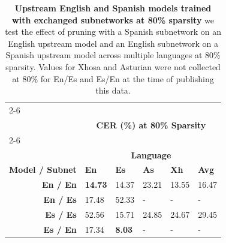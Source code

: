 
\clearpage
\begin{table}
\centering
\begin{tabular}{llllll}
& \\ \cline{2-6} \\[-2.3ex] 
& \multicolumn{5}{c}{\textbf{CER (\%) at 80\% Sparsity}}  \\[0.75ex] \cline{2-6} \\[-2.35ex]
& \multicolumn{5}{c}{\textbf{Language}}  \\[0.5ex] \hline
\multicolumn{1}{l|}{\textbf{Model / Subnet}} & \multicolumn{1}{l}{\textbf{En}} & \multicolumn{1}{l}{\textbf{Es}} & \multicolumn{1}{l}{\textbf{As}} & \multicolumn{1}{l}{\textbf{Xh}} & \multicolumn{1}{l}{\textbf{Avg}} \\ \hline
\multicolumn{1}{r|}{\textbf{En / En}} & \multicolumn{1}{l}{\textbf{14.73}} & \multicolumn{1}{l}{14.37} & \multicolumn{1}{l}{23.21} & \multicolumn{1}{l}{13.55} & 16.47 \\ %
\multicolumn{1}{r|}{\textbf{En / Es}} & \multicolumn{1}{l}{17.48} & \multicolumn{1}{l}{52.33} & \multicolumn{1}{l}{-} & \multicolumn{1}{l}{-} & - \\ %
\multicolumn{1}{r|}{\textbf{Es / Es}} & \multicolumn{1}{l}{52.56} & \multicolumn{1}{l}{15.71} & \multicolumn{1}{l}{24.85} & \multicolumn{1}{l}{24.67} & 29.45 \\ %
\multicolumn{1}{r|}{\textbf{Es / En}} & \multicolumn{1}{l}{17.34} & \multicolumn{1}{l}{\textbf{8.03}} & \multicolumn{1}{l}{-} & \multicolumn{1}{l}{-} & - \\ \hline
\end{tabular}
\caption{\textbf{Upstream English and Spanish models trained with exchanged subnetworks at 80\% sparsity} we test the effect of pruning with a Spanish subnetwork on an English upstream model and an English subnetwork on a Spanish upstream model across multiple languages at 80\% sparsity. Values for Xhosa and Asturian were not collected at 80\% for En/Es and Es/En at the time of publishing this data.}%
\label{app_tab:70perc_English_Mask_Results}
\end{table}


